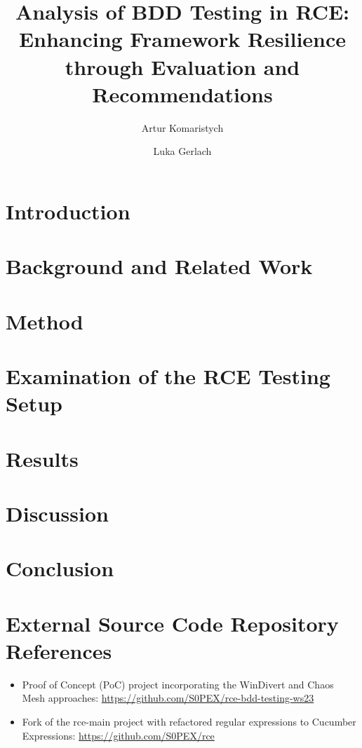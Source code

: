 \documentclass[runningheads]{llncs}
\begin{document}
%
\title{Analysis of BDD Testing in RCE: Enhancing Framework Resilience through Evaluation and Recommendations}
%
%
\author{Artur Komaristych \and Luka Gerlach}
%
%
%
\maketitle              %
%
\begin{abstract}

\end{abstract}
%
%
%
\section{Introduction}

\section{Background and Related Work}

\section{Method}

\section{Examination of the RCE Testing Setup}

\section{Results}
\label{sec:results}

\section{Discussion}
\label{sec:discussion}

\section{Conclusion}


\appendix
\appendixpage
\section{External Source Code Repository References}
\begin{itemize}
    \item Proof of Concept (PoC) project incorporating the WinDivert and Chaos Mesh approaches: \href{https://github.com/S0PEX/rce-bdd-testing-ws23}{https://github.com/S0PEX/rce-bdd-testing-ws23}
    \item Fork of the rce-main project with refactored regular expressions to Cucumber Expressions: \href{https://github.com/S0PEX/rce}{https://github.com/S0PEX/rce}
\end{itemize}

\clearpage


\end{document}
